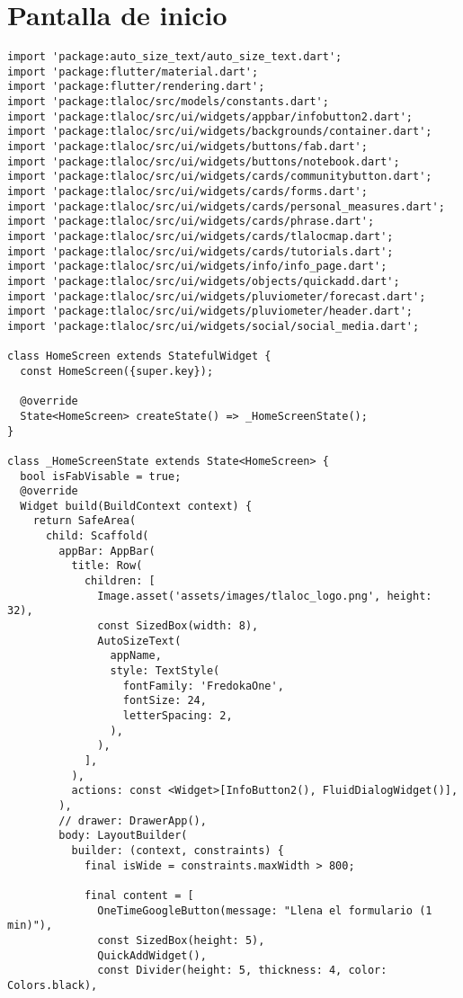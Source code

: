\section{Pantalla de inicio}
\label{anexo:alg12}
\begin{verbatim}
import 'package:auto_size_text/auto_size_text.dart';
import 'package:flutter/material.dart';
import 'package:flutter/rendering.dart';
import 'package:tlaloc/src/models/constants.dart';
import 'package:tlaloc/src/ui/widgets/appbar/infobutton2.dart';
import 'package:tlaloc/src/ui/widgets/backgrounds/container.dart';
import 'package:tlaloc/src/ui/widgets/buttons/fab.dart';
import 'package:tlaloc/src/ui/widgets/buttons/notebook.dart';
import 'package:tlaloc/src/ui/widgets/cards/communitybutton.dart';
import 'package:tlaloc/src/ui/widgets/cards/forms.dart';
import 'package:tlaloc/src/ui/widgets/cards/personal_measures.dart';
import 'package:tlaloc/src/ui/widgets/cards/phrase.dart';
import 'package:tlaloc/src/ui/widgets/cards/tlalocmap.dart';
import 'package:tlaloc/src/ui/widgets/cards/tutorials.dart';
import 'package:tlaloc/src/ui/widgets/info/info_page.dart';
import 'package:tlaloc/src/ui/widgets/objects/quickadd.dart';
import 'package:tlaloc/src/ui/widgets/pluviometer/forecast.dart';
import 'package:tlaloc/src/ui/widgets/pluviometer/header.dart';
import 'package:tlaloc/src/ui/widgets/social/social_media.dart';

class HomeScreen extends StatefulWidget {
  const HomeScreen({super.key});

  @override
  State<HomeScreen> createState() => _HomeScreenState();
}

class _HomeScreenState extends State<HomeScreen> {
  bool isFabVisable = true;
  @override
  Widget build(BuildContext context) {
    return SafeArea(
      child: Scaffold(
        appBar: AppBar(
          title: Row(
            children: [
              Image.asset('assets/images/tlaloc_logo.png', height: 32),
              const SizedBox(width: 8),
              AutoSizeText(
                appName,
                style: TextStyle(
                  fontFamily: 'FredokaOne',
                  fontSize: 24,
                  letterSpacing: 2,
                ),
              ),
            ],
          ),
          actions: const <Widget>[InfoButton2(), FluidDialogWidget()],
        ),
        // drawer: DrawerApp(),
        body: LayoutBuilder(
          builder: (context, constraints) {
            final isWide = constraints.maxWidth > 800;

            final content = [
              OneTimeGoogleButton(message: "Llena el formulario (1 min)"),
              const SizedBox(height: 5),
              QuickAddWidget(),
              const Divider(height: 5, thickness: 4, color: Colors.black),


\end{verbatim}

